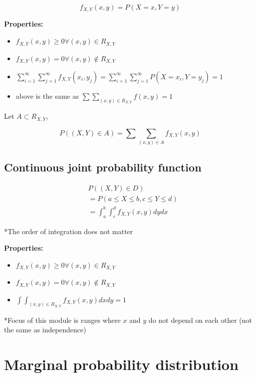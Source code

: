 \documentclass[twocolumn, 8pt]{extarticle}
\begin{document}
$$
f_{X, Y}(x, y) = P(X = x, Y = y)
$$

\textbf{Properties:}

\begin{itemize}
    \item $f_{X, Y}(x, y) \geq 0 \forall (x, y) \in R_{X, Y}$
    \item $f_{X, Y}(x, y) = 0 \forall (x, y) \not\in R_{X, Y}$
    \item $\displaystyle\sum^{\infty}_{i=1} \sum_{j=1}^{\infty} f_{X, Y}(x_i, y_j) = \sum^{\infty}_{i=1} \sum_{j=1}^{\infty} P(X = x_i, Y = y_j) = 1$
    \item above is the same as $\sum\sum_{(x, y) \in R_{X, Y}} f(x, y) = 1$
\end{itemize}

Let $A \subset R_{X, Y}$,

$$
P((X, Y) \in A) = \sum\sum_{(x, y) \in A}f_{X, Y}(x, y)
$$

\subsection*{Continuous joint probability function}

\begin{equation*}
    \begin{split}
        & P((X, Y) \in D) \\
        & = P(a \leq X \leq b, c \leq Y \leq d) \\
        & = \int_a^b\int_c^d f_{X, Y}(x, y) dy dx
    \end{split}
\end{equation*}

*The order of integration does not matter

\textbf{Properties:}

\begin{itemize}
    \item $f_{X, Y}(x, y) \geq 0 \forall (x, y) \in R_{X, Y}$
    \item $f_{X, Y}(x, y) = 0 \forall (x, y) \not\in R_{X, Y}$
    \item $\int\int_{(x, y) \in R_{X, Y}} f_{X, Y}(x, y) dx dy = 1$
\end{itemize}

*Focus of this module is ranges where $x$ and $y$ do not depend on each other (not the same as independence)

\section*{Marginal probability distribution}
\end{document}
